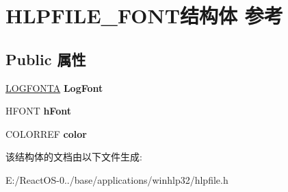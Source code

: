 \hypertarget{struct_h_l_p_f_i_l_e___f_o_n_t}{}\section{H\+L\+P\+F\+I\+L\+E\+\_\+\+F\+O\+N\+T结构体 参考}
\label{struct_h_l_p_f_i_l_e___f_o_n_t}
\subsection*{Public 属性}
\begin{DoxyCompactItemize}
\item 
\mbox{\label{struct_h_l_p_f_i_l_e___f_o_n_t_a83abafbc47615638afca517b5a42533f}} 
\hyperlink{struct_l_o_g_f_o_n_t_a}{L\+O\+G\+F\+O\+N\+TA} {\bfseries Log\+Font}
\item 
\mbox{\label{struct_h_l_p_f_i_l_e___f_o_n_t_a2be8f325787124d3ff50194090c7fa50}} 
H\+F\+O\+NT {\bfseries h\+Font}
\item 
\mbox{\label{struct_h_l_p_f_i_l_e___f_o_n_t_a119c8af69fdf0e308d224ed4718843f7}} 
C\+O\+L\+O\+R\+R\+EF {\bfseries color}
\end{DoxyCompactItemize}


该结构体的文档由以下文件生成\+:\begin{DoxyCompactItemize}
\item 
E\+:/\+React\+O\+S-\/0../base/applications/winhlp32/hlpfile.\+h\end{DoxyCompactItemize}
